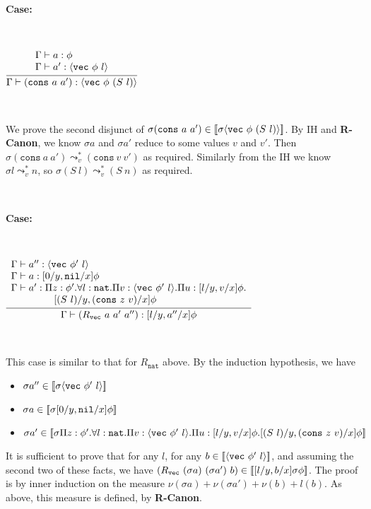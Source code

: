 \documentclass[copyright]{eptcs}
\newcommand{\vc}[0]{\texttt{vec}}
\newcommand{\nat}[0]{\texttt{nat}}
\newcommand{\nil}[0]{\texttt{nil}}
\newcommand{\cons}[0]{\texttt{cons}}
\newcommand{\leadstov}[0]{\leadsto_v}
\newcommand{\interp}[1]{[\negthinspace[#1]\negthinspace]}
\begin{document}
\ 

\noindent \textbf{Case:}

\

$\infer{\Gamma\vdash (\cons\ a\ a'):\langle \vc\ \phi\ (S\ l)\rangle}
      {\begin{array}{l}\Gamma\vdash a:\phi \\ \Gamma \vdash a':\langle \vc\ \phi\ l\rangle
       \end{array}}$

\ 

\noindent We prove the second disjunct of $\sigma (\cons\ a\ a') \in \interp{\sigma\langle \vc\ \phi\ (S\ l)\rangle}$. 
By IH and \textbf{R-Canon}, we know  $\sigma a$ and $\sigma a'$
reduce to some values $v$ and $v'$. Then $\sigma(\cons\ a\ a') \leadstov^* (\cons\ v\ v')$ as required. Similarly
from the IH we know $\sigma l \leadstov^* n$, so $\sigma(S\ l) \leadstov^* (S\ n)$ as required.

\

\noindent \textbf{Case:}

\

$\infer{\Gamma\vdash (R_\vc\ a\ a'\ a''):[l/y, a''/x]\phi}
      {\begin{array}{l}\Gamma \vdash a'' : \langle \vc\ \phi'\ l\rangle \\
       \Gamma \vdash a : [0/y,\nil/x]\phi \\
       \Gamma \vdash a' : \Pi z:\phi'. \forall l:\nat. \Pi v :\langle \vc\ \phi'\ l\rangle. \Pi u : [l/y, v/x]\phi. \\
        \ \ \ \ \ \ \ \ \ \ \ \ \  [(S\ l)/y, (\cons\ z\ v)/x]\phi
       \end{array}}$

\ 

\noindent This case is similar to that for $R_\nat$ above. By the induction hypothesis, we have
\begin{itemize}
\item $\sigma a''\in\interp{\sigma\langle \vc\ \phi'\ l\rangle}$
\item $\sigma a\in\interp{\sigma[0/y,\nil/x]\phi}$
\item $\sigma a'\in\interp{\sigma\Pi z:\phi'. \forall l:\nat. \Pi v :\langle \vc\ \phi'\ l\rangle. \Pi u : [l/y, v/x]\phi.[(S\ l)/y, (\cons\ z\ v)/x]\phi}$
\end{itemize}

\noindent It is sufficient to prove that for any $l$, for any
$b\in\interp{\langle\vc\ \phi'\ l\rangle}$, and assuming the
second two of these facts, we have $(R_\vc\ (\sigma a)\ (\sigma
a')\ b) \in\interp{[l/y,b/x]\sigma\phi}$. The proof is by inner
induction on the measure $\nu(\sigma a)+\nu(\sigma a')+\nu(b)+l(b)$.
As above, this measure is defined, by \textbf{R-Canon}. 
\end{document}
